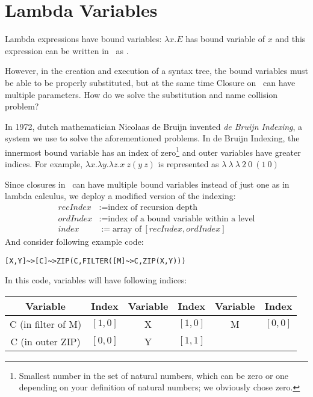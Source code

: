 \section{Lambda Variables}

Lambda expressions have bound variables: $\lambda x . E$ has bound variable of $x$ and this expression can be written in \tbas\ as .

However, in the creation and execution of a syntax tree, the bound variables must be able to be properly substituted, but at the same time Closure on \tbas\ can have multiple parameters. How do we solve the substitution and name collision problem?

In 1972, dutch mathematician Nicolaas de Bruijn invented \emph{de Bruijn Indexing}, a system we use to solve the aforementioned problems. In de Bruijn Indexing, the innermost bound variable has an index of zero\footnote{Smallest number in the set of natural numbers, which can be zero or one depending on your definition of natural numbers; we obviously chose zero.} and outer variables have greater indices. For example, $\lambda x . \lambda y . \lambda z . x\ z (y\ z)$ is represented as $\lambda\ \lambda\ \lambda\ 2\ 0\ (1\ 0)$

Since closures in \tbas\ can have multiple bound variables instead of just one as in lambda calculus, we deploy a modified version of the indexing:
\begin{align*}
recIndex &:= \text{index of recursion depth}\\
ordIndex &:= \text{index of a bound variable within a level}\\
index &:= \text{array of}\ [recIndex, ordIndex]
\end{align*}
And consider following example code:
\begin{lstlisting}
[X,Y]~>[C]~>ZIP(C,FILTER([M]~>C,ZIP(X,Y)))
\end{lstlisting}

In this code, variables will have following indices:

\begin{tabulary}{\textwidth}{cC|cC|cC}
Variable & Index & Variable & Index & Variable & Index \\
\hline
C {\condensedfont (in filter of M)} & $[1,0]$ & X & $[1,0]$ & M & $[0,0]$ \\
C {\condensedfont (in outer ZIP)} & $[0,0]$ & Y & $[1,1]$ & \ & \ \\
\end{tabulary}

